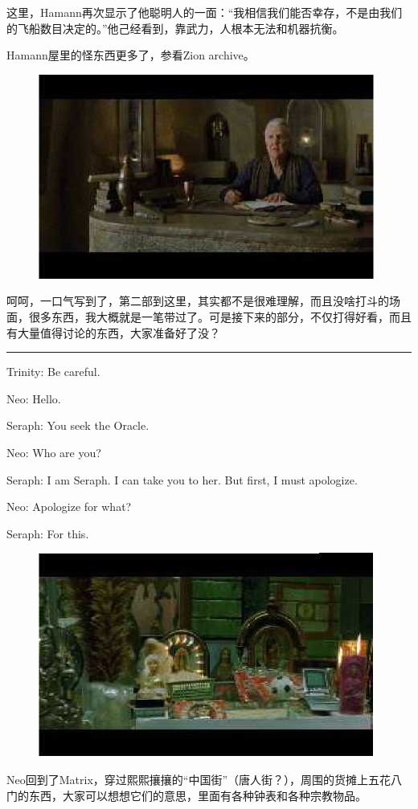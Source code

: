 \documentclass[UTF8]{ctexart}
\newcommand{\myparsep}{\noindent \rule[0.5ex]{\linewidth}{1pt}}
\newenvironment{myquote}{\color{green} \setlength{\leftskip}{6em} \setlength{\rightskip}{4em} \setlength{\parindent}{-2em}}{\par}
\begin{document}
这里，Hamann再次显示了他聪明人的一面：“我相信我们能否幸存，不是由我们的飞船数目决定的。”他己经看到，靠武力，人根本无法和机器抗衡。

Hamann屋里的怪东西更多了，参看Zion archive。

\begin{figure}[htb]
\centering
\includegraphics[width=0.5\linewidth]{fig/read_reloaded-55}
\end{figure}

呵呵，一口气写到了，第二部到这里，其实都不是很难理解，而且没啥打斗的场面，很多东西，我大概就是一笔带过了。可是接下来的部分，不仅打得好看，而且有大量值得讨论的东西，大家准备好了没？

\myparsep

\begin{myquote}
Trinity: Be careful.

Neo: Hello.

Seraph: You seek the Oracle.

Neo: Who are you?

Seraph: I am Seraph. I can take you to her. But first, I must apologize.

Neo: Apologize for what?

Seraph: For this.
\end{myquote}

\begin{figure}[htb]
\centering
\includegraphics[width=0.5\linewidth]{fig/read_reloaded-56}
\end{figure}

Neo回到了Matrix，穿过熙熙攘攘的“中国街”（唐人街？），周围的货摊上五花八门的东西，大家可以想想它们的意思，里面有各种钟表和各种宗教物品。
\end{document}
